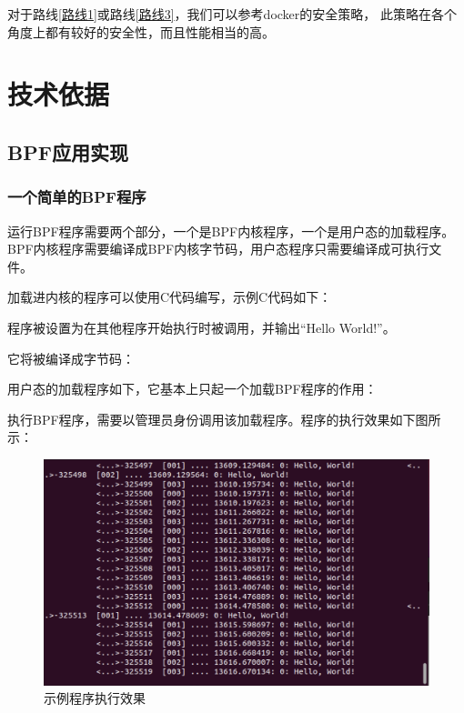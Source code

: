 \documentclass[AutoFakeBold,a4paper]{ctexart}
\begin{document}
对于路线\ref{路线1}或路线\ref{路线3}，我们可以参考docker的安全策略，
此策略在各个角度上都有较好的安全性，而且性能相当的高。

\section{技术依据}

\subsection{BPF应用实现}

\subsubsection{一个简单的BPF程序}

运行BPF程序需要两个部分，一个是BPF内核程序，一个是用户态的加载程序。
BPF内核程序需要编译成BPF内核字节码，用户态程序只需要编译成可执行文件。\cite{calavera2019linux}

加载进内核的程序可以使用C代码编写，示例C代码如下：



程序被设置为在其他程序开始执行时被调用，并输出“Hello World!”。

它将被编译成字节码：



用户态的加载程序如下，它基本上只起一个加载BPF程序的作用：



执行BPF程序，需要以管理员身份调用该加载程序。程序的执行效果如下图所示：

\begin{figure}[H]
    \centering
    \includegraphics[width=0.7\columnwidth]{../LiangHengyu/hello_world/test1.png}
    \caption{示例程序执行效果}
\end{figure}
\end{document}
